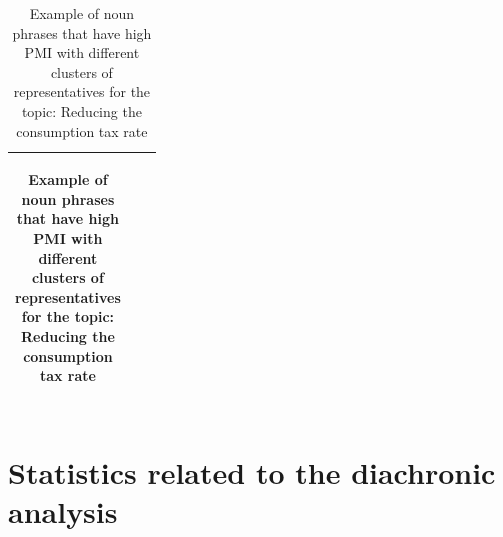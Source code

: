 \documentclass[final,5p,times,twocolumn,authoryear]{elsarticle}
\begin{document}
\begin{table}[htbp]
\begin{CJK}{UTF8}{min}
\begin{tabularx}{\textwidth}{|>{\centering\arraybackslash}X|>{\centering\arraybackslash}X|>{\centering\arraybackslash}X|}
\begin{tabular}[c]{@{}l@{}}
\end{tabular} \\ \hline
\end{tabularx}
\caption{Example of noun phrases that have high PMI with different clusters of representatives for the topic: Reducing the consumption tax rate}
\label{table:PMI-taxrate-jp}
\end{CJK}
\end{table}

\clearpage
\twocolumn

\section{Statistics related to the diachronic analysis}
\begin{table}[h]
	\begin{CJK}{UTF8}{min}


\end{CJK}
\end{table}
\end{document}

